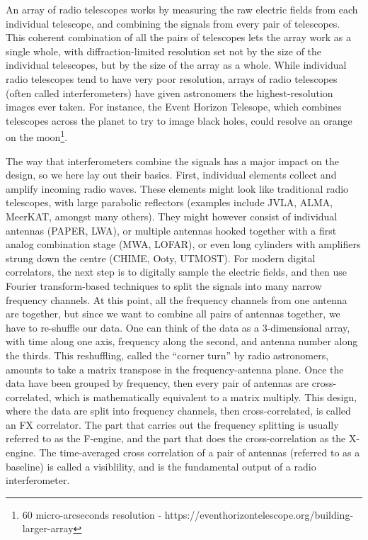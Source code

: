 \documentclass[letterpaper,11pt,preprint]{aastex}
\begin{document}
An array of radio telescopes works by measuring the raw electric
fields from each individual telescope, and combining the signals from
every pair of telescopes.  This coherent combination of all the pairs
of telescopes lets the array work as a single whole, with
diffraction-limited resolution set not by the size of the individual
telescopes, but by the size of the array as a whole.  While individual
radio telescopes tend to have very poor resolution, arrays of radio
telescopes (often called interferometers) have given astronomers the
highest-resolution images ever taken.  For instance, the Event Horizon
Telesope, which combines telescopes across the planet to try to image
black holes, could resolve an orange on the moon\footnote{60
  micro-arcseconds resolution -
  https://eventhorizontelescope.org/building-larger-array}.

The way that interferometers combine the signals has a major impact on
the design, so we here lay out their basics.  First,
individual elements collect and amplify incoming radio waves.  These
elements might look like traditional radio telescopes, with large
parabolic reflectors (examples include JVLA, ALMA, MeerKAT, amongst
many others).  They might however consist of individual antennas
(PAPER, LWA), or multiple antennas hooked together with a first analog
combination stage (MWA, LOFAR), or even long cylinders with amplifiers
strung down the centre (CHIME, Ooty, UTMOST).  For modern digital
correlators, the next step is to digitally sample the electric fields,
and then use Fourier transform-based techniques to split the signals
into many narrow frequency channels.  At this point, all the frequency
channels from one antenna are together, but since we want to combine
all pairs of antennas together, we have to re-shuffle our data.  One
can think of the data as a 3-dimensional array, with time along one
axis, frequency along the second, and antenna number along the thirds.
This reshuffling, called the ``corner turn'' by radio astronomers,
amounts to take a matrix transpose in the frequency-antenna plane.
Once the data have been grouped by frequency, then every pair of
antennas are cross-correlated, which is mathematically equivalent to a
matrix multiply.  This design, where the data are split into frequency
channels, then cross-correlated, is called an FX correlator.  The part
that carries out the frequency splitting is usually referred to as the
F-engine, and the part that does the cross-correlation as the
X-engine.  The time-averaged cross correlation of a pair of antennas
(referred to as a baseline) is called a visiblility, and is the
fundamental output of a radio interferometer.
\end{document}

